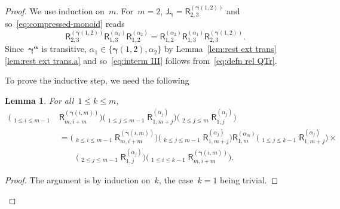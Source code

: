 \documentclass[12pt, reqno]{amsart}
\newcommand{\sfR}{\mathsf{R}}
\newtheorem{lemma}[theorem]{Lemma}
\theoremstyle{definition}
\newcommand{\dscprod}{\mathop{\overleftarrow{\prod}}}
\numberwithin{equation}{section}
\begin{document}
\begin{proof}
We use induction on~$m$.
For~$m=2$, $\mathsf J_{\boldsymbol\gamma}=\sfR_{2,3}^{(\boldsymbol\gamma(1,2))}$ and so~\eqref{eq:compressed-monoid}
reads 
\begin{equation}\label{eq:interm III}
\sfR_{2,3}^{(\boldsymbol\gamma(1,2))}\sfR_{1,3}^{(\alpha_1)}\sfR_{1,2}^{(\alpha_2)}=
\sfR_{1,2}^{(\alpha_2)}\sfR_{1,3}^{(\alpha_1)}\sfR_{2,3}^{(\boldsymbol\gamma(1,2))}.
\end{equation}
Since~$\boldsymbol\gamma^{\boldsymbol{\alpha}}$ is transitive, $\alpha_1\in
\{\boldsymbol\gamma(1,2),\alpha_2\}$ by Lemma~\ref{lem:rest ext trans}\ref{lem:rest ext trans.a} and so~\eqref{eq:interm III} follows from~\eqref{eq:defn rel QTr}.

To prove the inductive step, we need the following
\begin{lemma}\label{lem:move}
For all~$1\le k\le m$,
\begin{align*}
\Big(\dscprod_{1\le i\le m-1}&
\sfR_{m,i+m}^{(\boldsymbol\gamma(i,m))}\Big)\Big(\dscprod_{1\le j\le m-1}
\sfR_{1,m+j}^{(\alpha_j)}\Big)\Big(\dscprod_{2\le j\le m}
\sfR_{1,j}^{(\alpha_j)}\Big)\\
&=\Big(\dscprod_{k\le i\le m-1}
\sfR_{m,i+m}^{(\boldsymbol\gamma(i,m))}\Big)
\Big(\dscprod_{k\le j\le m-1}
\sfR_{1,m+j}^{(\alpha_j)}\Big)\sfR_{1,m}^{(\alpha_m)}
\Big(\dscprod_{1\le j\le k-1}
\sfR_{1,m+j}^{(\alpha_j)}\Big)\times\\
&\qquad \Big(\dscprod_{2\le j\le m-1}
\sfR_{1,j}^{(\alpha_j)}\Big)\Big(\dscprod_{1\le i\le k-1}
\sfR_{m,i+m}^{(\boldsymbol\gamma(i,m))}\Big).
\end{align*}
\end{lemma}
\begin{proof}
The argument is by induction on~$k$, the case~$k=1$ being trivial.


\end{proof}
\end{proof}
\end{document}
